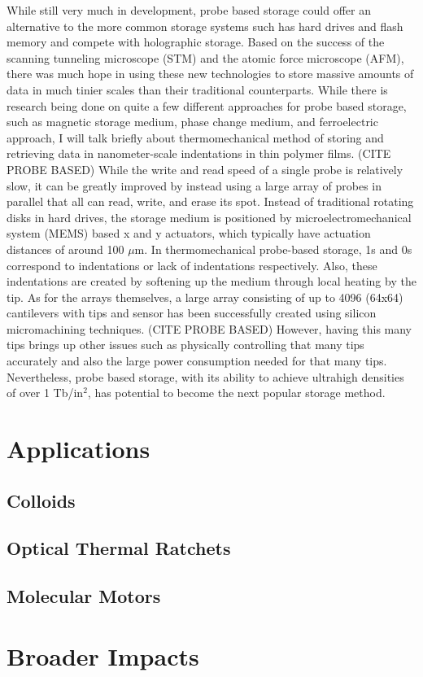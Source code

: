\documentclass[ aip, 12pt]{revtex4-1} %
\begin{document}
While still very much in development, probe based storage could offer an alternative to the more common storage systems such has hard drives and flash memory and compete with holographic storage. Based on the success of the scanning tunneling microscope (STM) and the atomic force microscope (AFM), there was much hope in using these new technologies to store massive amounts of data in much tinier scales than their traditional counterparts. While there is research being done on quite a few different approaches for probe based storage, such as magnetic storage medium, phase change medium, and ferroelectric approach, I will talk briefly about thermomechanical method of storing and retrieving data in nanometer-scale indentations in thin polymer films. (CITE PROBE BASED) While the write and read speed of a single probe is relatively slow, it can be greatly improved by instead using a large array of probes in parallel that all can read, write, and erase its spot. Instead of traditional rotating disks in hard drives, the storage medium is positioned by microelectromechanical system (MEMS) based x and y actuators, which typically have actuation distances of around 100 $\mu$m. In thermomechanical probe-based storage, 1s and 0s correspond to indentations or lack of indentations respectively. Also, these indentations are created by softening up the medium through local heating by the tip. As for the arrays themselves, a large array consisting of up to 4096 (64x64) cantilevers with tips and sensor has been successfully created using silicon micromachining techniques. (CITE PROBE BASED) However, having this many tips brings up other issues such as physically controlling that many tips accurately and also the large power consumption needed for that many tips. Nevertheless, probe based storage, with its ability to achieve ultrahigh densities of over 1 Tb/in$^2$, has potential to become the next popular storage method.


\section{Applications}
\subsection{Colloids}


\subsection {Optical Thermal Ratchets}


\subsection{Molecular Motors}

\section{Broader Impacts}




\end{document}
